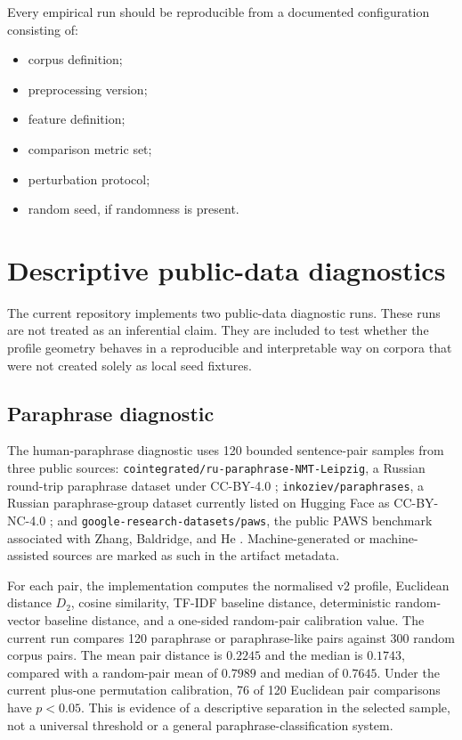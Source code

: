 \documentclass[11pt]{article}
\begin{document}
Every empirical run should be reproducible from a documented configuration consisting of:
\begin{itemize}
    \item corpus definition;
    \item preprocessing version;
    \item feature definition;
    \item comparison metric set;
    \item perturbation protocol;
    \item random seed, if randomness is present.
\end{itemize}

\section{Descriptive public-data diagnostics}

The current repository implements two public-data diagnostic runs. These runs are not treated as an inferential claim. They are included to test whether the profile geometry behaves in a reproducible and interpretable way on corpora that were not created solely as local seed fixtures.

\subsection{Paraphrase diagnostic}

The human-paraphrase diagnostic uses 120 bounded sentence-pair samples from three public sources: \texttt{cointegrated/ru-paraphrase-NMT-Leipzig}, a Russian round-trip paraphrase dataset under CC-BY-4.0 \cite{CointegratedRuParaphraseNMTLeipzig}; \texttt{inkoziev/paraphrases}, a Russian paraphrase-group dataset currently listed on Hugging Face as CC-BY-NC-4.0 \cite{InkozievParaphrases}; and \texttt{google-research-datasets/paws}, the public PAWS benchmark associated with Zhang, Baldridge, and He \cite{GoogleResearchPAWSDataset,ZhangEtAl2019PAWS}. Machine-generated or machine-assisted sources are marked as such in the artifact metadata.

For each pair, the implementation computes the normalised v2 profile, Euclidean distance $D_2$, cosine similarity, TF-IDF baseline distance, deterministic random-vector baseline distance, and a one-sided random-pair calibration value. The current run compares 120 paraphrase or paraphrase-like pairs against 300 random corpus pairs. The mean pair distance is $0.2245$ and the median is $0.1743$, compared with a random-pair mean of $0.7989$ and median of $0.7645$. Under the current plus-one permutation calibration, 76 of 120 Euclidean pair comparisons have $p < 0.05$. This is evidence of a descriptive separation in the selected sample, not a universal threshold or a general paraphrase-classification system.
\end{document}
